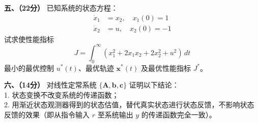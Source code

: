 \documentclass[11pt,a4paper]{ctexart}
\begin{document}
\vspace{1.5em}

\noindent
\textbf{五、（22分）} 已知系统的状态方程：
\begin{align*}
    \dot{x}_1 &= x_2, \quad x_1(0) = 1 \\
    \dot{x}_2 &= u, \quad x_2(0) = -1
\end{align*}
试求使性能指标
\begin{equation*}
    J = \int_0^\infty (x_1^2 + 2x_1x_2 + 2x_2^2 + u^2) \, dt
\end{equation*}
最小的最优控制 $u^*(t)$、最优轨迹 $\bm{x}^*(t)$ 及最优性能指标 $J^*$。

\vspace{1.5em}

\noindent
\textbf{六、（14分）} 对线性定常系统 $\{\bm{A}, \bm{b}, \bm{c}\}$ 证明以下结论：\\
1. 状态变换不改变系统的传递函数；\\
2. 用渐近状态观测器得到的状态估值，替代真实状态进行状态反馈，不影响状态反馈的效果（即从指令输入 $r$ 至系统输出 $y$ 的传递函数完全一致）。
\end{document}
